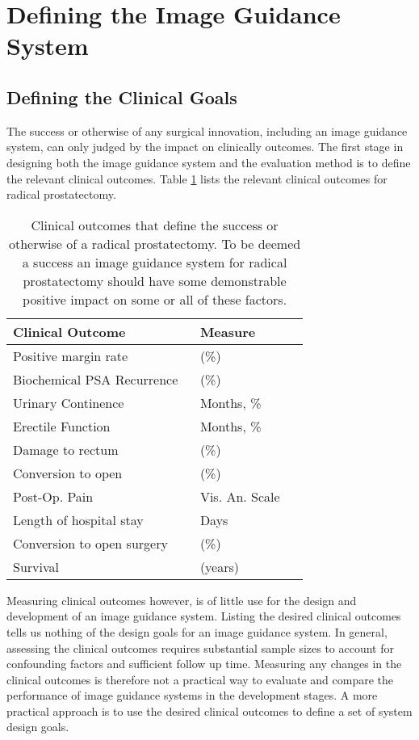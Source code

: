 \documentclass[3p,twocolumn,preprint,10pt]{elsarticle}
\begin{document}
\section{Defining the Image Guidance System}
\subsection{Defining the Clinical Goals}
The success or otherwise of any surgical innovation, including an
image guidance system, can only judged by the impact on clinically 
outcomes. The first stage in designing both the image guidance system
and the evaluation method is to define the relevant clinical outcomes.
Table \ref{tab:Clinical} lists the relevant clinical outcomes for
radical prostatectomy.

\begin{table}
\begin{tabular}{|p{0.6\linewidth}|p{0.35\linewidth}|} \hline
Clinical Outcome & Measure \\ \hline
Positive margin rate & (\%) \\
Biochemical PSA Recurrence & (\%) \\
Urinary Continence & Months, \% \\
Erectile Function  & Months, \% \\
Damage to rectum & (\%) \\ 
Conversion to open & (\%) \\
Post-Op. Pain & Vis. An. Scale \\
Length of hospital stay & Days \\
Conversion to open surgery & (\%) \\
Survival & (years) \\ \hline
\end{tabular}
\caption{\label{tab:Clinical}Clinical outcomes that define the success or otherwise 
of a radical prostatectomy. To be deemed a success an image guidance
system for radical prostatectomy should have some demonstrable positive impact
on some or all of these factors.}
\end{table}

Measuring clinical outcomes however, is of little use for the design and 
development of an image guidance system. Listing the desired clinical 
outcomes tells us nothing of the design goals for an 
image guidance system. In general, assessing the clinical outcomes 
requires substantial sample sizes to account for confounding factors and
sufficient follow up time. Measuring any changes in the clinical outcomes
is therefore not a practical way to evaluate and compare the performance
of image guidance systems in the development stages. A more practical 
approach is to use the desired clinical outcomes to define a set of system design
goals. 
\end{document}
